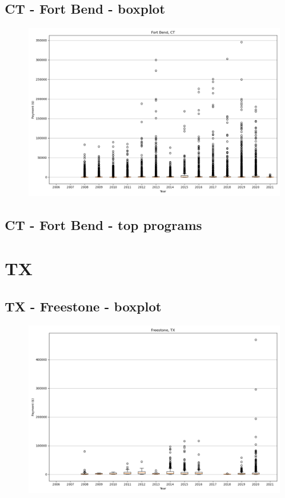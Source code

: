 \subsection*{CT - Fort Bend - boxplot}
\begin{figure}[h]
\centering
\includegraphics[width=7in]{../output/boxplots/counties/Fort Bend-CT_boxplot.png}
\end{figure}


\subsection*{CT - Fort Bend - top programs}

\newpage
\section*{TX}
\subsection*{TX - Freestone - boxplot}
\begin{figure}[h]
\centering
\includegraphics[width=7in]{../output/boxplots/counties/Freestone-TX_boxplot.png}
\end{figure}


